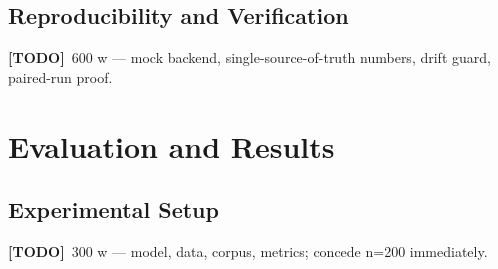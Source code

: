 \documentclass[11pt,a4paper]{report}
\newcommand{\todo}[1]{\par\noindent\textcolor{red!70!black}{\small\textbf{[TODO]}~#1}\par}
\begin{document}
\section{Reproducibility and Verification}
\label{sec:impl-verification}
\todo{600 w — mock backend, single-source-of-truth numbers, drift guard, paired-run proof.}

\chapter{Evaluation and Results}
\label{ch:eval}

\section{Experimental Setup}
\label{sec:eval-setup}
\todo{300 w — model, data, corpus, metrics; concede n=200 immediately.}
\end{document}
